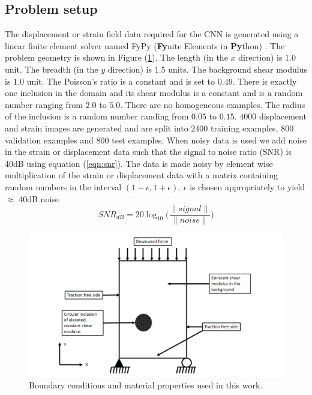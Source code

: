 \documentclass[12pt]{article}
\begin{document}
\subsection{\label{sect:probsetup}Problem setup}
The displacement or strain field data required for the CNN is generated using a linear finite element solver named FyPy (\textbf{Fy}nite Elements in \textbf{Py}thon) \cite{misc:fypy}. The problem geometry is shown in Figure (\ref{fig:bc}). The length (in the $x$ direction) is $1.0$ unit. The breadth (in the $y$ direction) is 1.5 units. The background shear modulus is $1.0$ unit. The Poisson's ratio is a constant and is set to $0.49$. There is exactly one inclusion in the domain and its shear modulus is a constant and is a random number ranging from $2.0$ to $5.0$. There are no homogeneous examples. The radius of the inclusion is a random number randing from $0.05$ to $0.15$. $4000$ displacement and strain images are generated and are split into $2400$ training examples, $800$ validation examples and $800$ test examples. When noisy data is used we add noise in the strain or displacement data such that the signal to noise ratio (SNR) is 40dB using equation (\ref{eqn:snr}). The data is made noisy by element wise multiplication of the strain or displacement data with a matrix containing random numbers in the interval $(1-\epsilon,1+\epsilon)$. $\epsilon$ is chosen appropriately to yield $\approx$ 40dB noise
\begin{equation}
  \label{eqn:snr}
  SNR_{dB} = 20\log_{10}\Big(\frac{\|signal\|}{\|noise\|}\Big)
\end{equation}
%
\begin{figure} 
   \centering
    \includegraphics[totalheight=9cm]{Figures/bc.png}
  \caption{\label{fig:bc}Boundary conditions and material properties used in this work. }
\end{figure}
%
\end{document}
